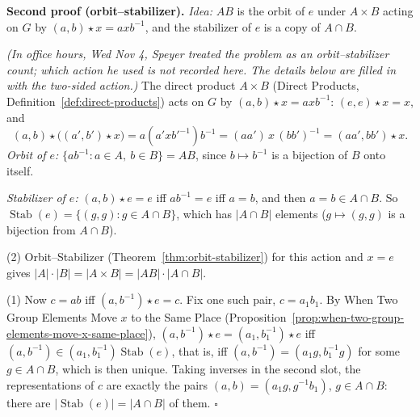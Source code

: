 \documentclass[11pt]{report}
\renewenvironment{proof}[1][Proof]{\noindent\textbf{#1.} }{\hfill$\square$\par\vspace{5pt}}
\begin{document}
\begin{proof}[Second proof (orbit--stabilizer)]
\textit{Idea:} $AB$ is the orbit of $e$ under $A \times B$ acting on $G$ by $(a, b) \star x = axb^{-1}$, and the stabilizer of $e$ is a copy of $A \cap B$.\par
\textit{(In office hours, Wed Nov 4, Speyer treated the problem as an orbit--stabilizer count; which action he used is not recorded here. The details below are filled in with the two-sided action.)} The direct product $A \times B$ (Direct Products, Definition~\ref{def:direct-products}) acts on $G$ by $(a, b) \star x = axb^{-1}$: $(e, e) \star x = x$, and
\[ (a, b) \star \bigl((a', b') \star x\bigr) = a(a'xb'^{-1})b^{-1} = (aa')\,x\,(bb')^{-1} = (aa', bb') \star x. \]
\emph{Orbit of $e$:} $\{ab^{-1} : a \in A,\ b \in B\} = AB$, since $b \mapsto b^{-1}$ is a bijection of $B$ onto itself.

\emph{Stabilizer of $e$:} $(a, b) \star e = e$ iff $ab^{-1} = e$ iff $a = b$, and then $a = b \in A \cap B$. So $\operatorname{Stab}(e) = \{(g, g) : g \in A \cap B\}$, which has $|A \cap B|$ elements ($g \mapsto (g, g)$ is a bijection from $A \cap B$).

(2) Orbit--Stabilizer (Theorem~\ref{thm:orbit-stabilizer}) for this action and $x = e$ gives $|A| \cdot |B| = |A \times B| = |AB| \cdot |A \cap B|$.

(1) Now $c = ab$ iff $(a, b^{-1}) \star e = c$. Fix one such pair, $c = a_1b_1$. By When Two Group Elements Move $x$ to the Same Place (Proposition~\ref{prop:when-two-group-elements-move-x-same-place}), $(a, b^{-1}) \star e = (a_1, b_1^{-1}) \star e$ iff $(a, b^{-1}) \in (a_1, b_1^{-1})\operatorname{Stab}(e)$, that is, iff $(a, b^{-1}) = (a_1g, b_1^{-1}g)$ for some $g \in A \cap B$, which is then unique. Taking inverses in the second slot, the representations of $c$ are exactly the pairs $(a, b) = (a_1g, g^{-1}b_1)$, $g \in A \cap B$: there are $|\operatorname{Stab}(e)| = |A \cap B|$ of them.
\end{proof}
\end{document}
